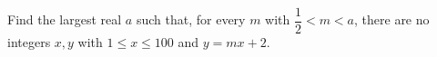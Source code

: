 Find the largest real $a$ such that, for every $m$ with $\dfrac{1}{2}<m<a$, there are no integers $x,y$ with $1\le x\le100$ and $y=mx+2$.
